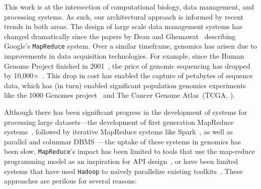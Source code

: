 \documentclass[masters]{ucbthesis}
\begin{document}
This work is at the intersection of computational biology, data management, and processing
systems. As such, our architectural approach is informed by recent trends in both areas. The design of
large scale data management systems has changed dramatically since the papers by Dean and
Ghemawat~\cite{dean04, dean08} describing Google's \texttt{MapReduce} system. Over a
similar timeframe, genomics has arisen due to improvements in data acquisition technologies. For
example, since the Human Genome Project finished in 2001~\cite{lander01}, the price of genomic
sequencing has dropped by 10,000$\times$~\cite{nhgri}. This drop in cost has enabled the capture of
petabytes of sequence data, which has (in turn) enabled significant population genomics experiments like 
the 1000 Genomes project~\cite{siva08} and The Cancer Genome Atlas~(TCGA, \cite{weinstein13}).

Although there has been significant progress in the development of systems for processing large
datasets---the development of first generation MapReduce systems~\cite{dean04}, followed by
iterative MapReduce systems like Spark~\cite{zaharia10}, as well as parallel and columnar
DBMS~\cite{abadi06, lamb12}---the uptake of these systems in genomics has been slow.
\texttt{MapReduce}'s impact has been limited to tools that use the map-reduce programming model as an
inspiration for API design~\cite{mckenna10}, or have been limited systems that have used \texttt{Hadoop}
to na\"{i}vely parallelize existing toolkits~\cite{langmead09, schatz09}. These approaches are perilous for
several reasons:
\end{document}
